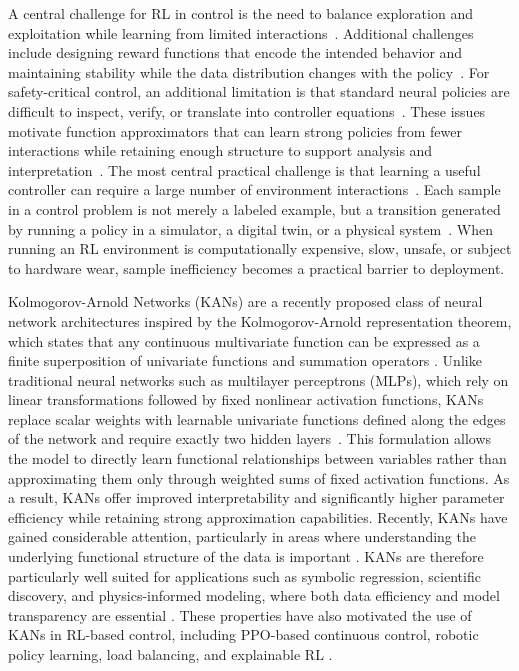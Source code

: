 \documentclass{article}
\begin{document}
A central challenge for RL in control is the need to balance exploration and exploitation while learning from limited interactions~\cite{Zhangetal2021}.
Additional challenges include designing reward functions that encode the intended behavior and maintaining stability while the data distribution changes with the policy~\cite{eschmann2021reward}.
For safety-critical control, an additional limitation is that standard neural policies are difficult to inspect, verify, or translate into controller equations~\cite{Lietal2025}.
These issues motivate function approximators that can learn strong policies from fewer interactions while retaining enough structure to support analysis and interpretation~\cite{ferrari2005smooth}.
The most central practical challenge is that learning a useful controller can require a large number of environment interactions~\cite{zhang2021sample}.
Each sample in a control problem is not merely a labeled example, but a transition generated by running a policy in a simulator, a digital twin, or a physical system~\cite{tao2022digital}.
When running an RL environment is computationally expensive, slow, unsafe, or subject to hardware wear, sample inefficiency becomes a practical barrier to deployment.

Kolmogorov-Arnold Networks (KANs) are a recently proposed class of neural network architectures inspired by the Kolmogorov-Arnold representation theorem, which states that any continuous multivariate function can be expressed as a finite superposition of univariate functions and summation operators \cite{kolmogorov1956representation, arnold1963representation}.
Unlike traditional neural networks such as multilayer perceptrons (MLPs), which rely on linear transformations followed by fixed nonlinear activation functions, KANs replace scalar weights with learnable univariate functions defined along the edges of the network and require exactly two hidden layers~\cite{liu2024kan}.
This formulation allows the model to directly learn functional relationships between variables rather than approximating them only through weighted sums of fixed activation functions.
As a result, KANs offer improved interpretability and significantly higher parameter efficiency while retaining strong approximation capabilities.
Recently, KANs have gained considerable attention, particularly in areas where understanding the underlying functional structure of the data is important \cite{somvanshi2025survey,essahraui2025kanoverview,sohail2024training}.
KANs are therefore particularly well suited for applications such as symbolic regression, scientific discovery, and physics-informed modeling, where both data efficiency and model transparency are essential \cite{somvanshi2025survey,essahraui2025kanoverview}.
These properties have also motivated the use of KANs in RL-based control, including PPO-based continuous control, robotic policy learning, load balancing, and explainable RL \cite{kich2024online,bayeh2026kanppo,chen2025kanpolicy,singh2026loadbalancing,dalto2025explainable}.
\end{document}
